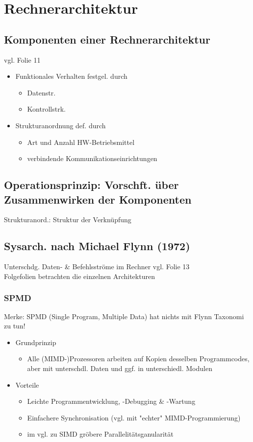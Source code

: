 \section{Rechnerarchitektur}
\subsection{Komponenten einer Rechnerarchitektur}
vgl. Folie 11
\begin{itemize}
	\item Funktionales Verhalten festgel. durch
		\begin{itemize}
			\item Datenstr.
			\item Kontrollstrk.
		\end{itemize}
	\item Strukturanordnung def. durch
		\begin{itemize}
			\item Art und Anzahl HW-Betriebsmittel
			\item verbindende Kommunikationseinrichtungen
		\end{itemize}
\end{itemize}


\subsection{Operationsprinzip: Vorschft. über Zusammenwirken der Komponenten}
Strukturanord.: Struktur der Verknüpfung

\subsection{Sysarch. nach Michael Flynn (1972)}
Unterschdg. Daten- \& Befehlsströme im Rechner
vgl. Folie 13 \\
Folgefolien betrachten die einzelnen Architekturen

\subsubsection{SPMD}
Merke: SPMD (Single Program, Multiple Data) hat nichts mit Flynn Taxonomi zu tun!
\begin{itemize}
	\item Grundprinzip
		\begin{itemize}
			\item Alle (MIMD-)Prozessoren arbeiten auf Kopien desselben Programmcodes, aber mit unterschdl. Daten und ggf. in unterschiedl. Modulen
		\end{itemize}
	\item Vorteile
		\begin{itemize}
			\item Leichte Programmentwicklung, -Debugging \& -Wartung
			\item Einfachere Synchronisation (vgl. mit "echter" MIMD-Programmierung)
			\item im vgl. zu SIMD gröbere Parallelitätsganularität
		\end{itemize}
\end{itemize}


